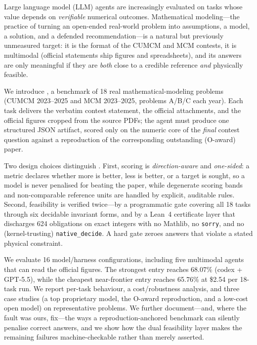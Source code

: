 Large language model (LLM) agents are increasingly evaluated on tasks whose value depends on \emph{verifiable} numerical outcomes. Mathematical modeling---the practice of turning an open-ended real-world problem into assumptions, a model, a solution, and a defended recommendation---is a natural but previously unmeasured target: it is the format of the CUMCM and MCM contests, it is multimodal (official statements ship figures and spreadsheets), and its answers are only meaningful if they are \emph{both} close to a credible reference \emph{and} physically feasible.

We introduce \bench{}, a benchmark of 18 real mathematical-modeling problems (CUMCM 2023--2025 and MCM 2023--2025, problems A/B/C each year). Each task delivers the verbatim contest statement, the official attachments, and the official figures cropped from the source PDFs; the agent must produce one structured JSON artifact, scored only on the numeric core of the \emph{final} contest question against a reproduction of the corresponding outstanding (O-award) paper.

Two design choices distinguish \bench{}. First, scoring is \emph{direction-aware} and \emph{one-sided}: a metric declares whether more is better, less is better, or a target is sought, so a model is never penalised for beating the paper, while degenerate scoring bands and non-comparable reference units are handled by explicit, auditable rules. Second, feasibility is verified twice---by a programmatic gate covering all 18 tasks through six decidable invariant forms, and by a Lean~4 certificate layer that discharges 624 obligations on exact integers with no Mathlib, no \texttt{sorry}, and no (kernel-trusting) \texttt{native\_decide}. A hard gate zeroes answers that violate a stated physical constraint.

We evaluate 16 model/harness configurations, including five multimodal agents that can read the official figures. The strongest entry reaches \oeval{} 68.07\% (codex + GPT-5.5), while the cheapest near-frontier entry reaches 65.76\% at \$2.54 per 18-task run. We report per-task behaviour, a cost/robustness analysis, and three case studies (a top proprietary model, the O-award reproduction, and a low-cost open model) on representative problems. We further document---and, where the fault was ours, fix---the ways a reproduction-anchored benchmark can silently penalise correct answers, and we show how the dual feasibility layer makes the remaining failures machine-checkable rather than merely asserted.
